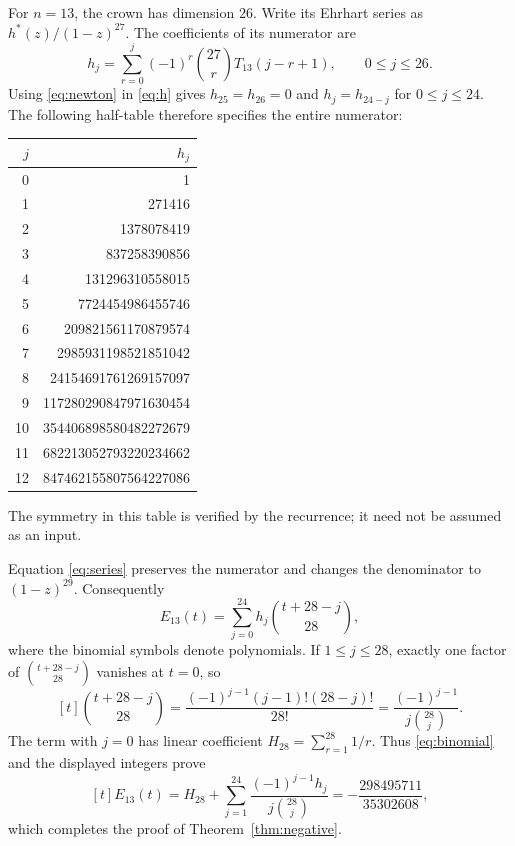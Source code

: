 \documentclass[11pt,letterpaper]{article}
\begin{document}
For $n=13$, the crown has dimension $26$. Write its Ehrhart series as $h^*(z)/(1-z)^{27}$. The coefficients of its numerator are
\begin{equation}\label{eq:h}
 h_j=\sum_{r=0}^j(-1)^r\binom{27}{r}T_{13}(j-r+1),\qquad 0\leq j\leq26.
\end{equation}
Using \eqref{eq:newton} in \eqref{eq:h} gives $h_{25}=h_{26}=0$ and $h_j=h_{24-j}$ for $0\leq j\leq24$. The following half-table therefore specifies the entire numerator:
\begin{center}
\begin{tabular}{@{}rr@{}}
\toprule
$j$&$h_j$\\\midrule
0&1\\
1&271416\\
2&1378078419\\
3&837258390856\\
4&131296310558015\\
5&7724454986455746\\
6&209821561170879574\\
7&2985931198521851042\\
8&24154691761269157097\\
9&117280290847971630454\\
10&354406898580482272679\\
11&682213052793220234662\\
12&847462155807564227086\\
\bottomrule
\end{tabular}
\end{center}
The symmetry in this table is verified by the recurrence; it need not be assumed as an input.

Equation \eqref{eq:series} preserves the numerator and changes the denominator to $(1-z)^{29}$. Consequently
\begin{equation}\label{eq:binomial}
 E_{13}(t)=\sum_{j=0}^{24}h_j\binom{t+28-j}{28},
\end{equation}
where the binomial symbols denote polynomials. If $1\leq j\leq28$, exactly one factor of $\binom{t+28-j}{28}$ vanishes at $t=0$, so
\[
 [t]\binom{t+28-j}{28}=\frac{(-1)^{j-1}(j-1)!(28-j)!}{28!}
 =\frac{(-1)^{j-1}}{j\binom{28}{j}}.
\]
The term with $j=0$ has linear coefficient $H_{28}=\sum_{r=1}^{28}1/r$. Thus \eqref{eq:binomial} and the displayed integers prove
\begin{equation}\label{eq:linearh}
 [t]E_{13}(t)=H_{28}+\sum_{j=1}^{24}\frac{(-1)^{j-1}h_j}{j\binom{28}{j}}
 =-\frac{298495711}{35302608},
\end{equation}
which completes the proof of Theorem~\ref{thm:negative}.
\end{document}
